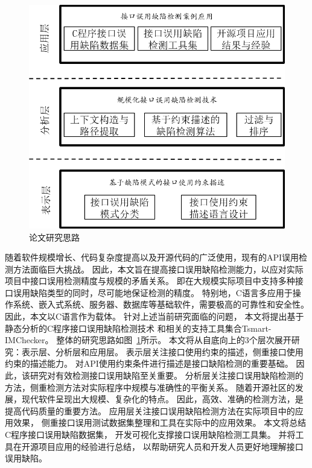 \begin{figure}[b]
	\centering
	\includegraphics[width=0.85\linewidth]{figures/cp1-overview.png}
	\caption{
		论文研究思路
	}
	\label{fig:1-3-overview}
\end{figure}

随着软件规模增长、代码复杂度提高以及开源代码的广泛使用，现有的API误用检测方法面临巨大挑战。
因此，本文旨在提高接口误用缺陷检测能力，以应对实际项目中接口误用检测精度与规模的矛盾关系。
即在大规模实际项目中支持多种接口误用缺陷类型的同时，尽可能地保证检测的精度。
特别地，C语言多应用于操作系统、嵌入式系统、服务器、数据库等基础软件，需要极高的可靠性和安全性。
因此，本文以C语言作为载体。
针对上述当前研究面临的问题，
本文将提出基于静态分析的C程序接口误用缺陷检测技术
和相关的支持工具集合Tsmart-IMChecker。
整体的研究思路如图~\ref{fig:1-3-overview}所示。
本文将从自底向上的3个层次展开研究：表示层、分析层和应用层。
表示层关注接口使用约束的描述，侧重接口使用约束的描述能力。
对API使用约束条件进行描述是接口缺陷检测的重要基础。
因此，该研究对有效检测接口误用缺陷至关重要。
分析层关注接口误用缺陷检测的方法，侧重检测方法对实际程序中规模与准确性的平衡关系。
随着开源社区的发展，现代软件呈现出大规模、复杂化的特点。
因此，高效、准确的检测方法，是提高代码质量的重要方法。
应用层关注接口误用缺陷检测方法在实际项目中的应用效果，
侧重接口误用测试数据集整理和工具在实际中的应用效果。
本文将总结C程序接口误用缺陷数据集，
开发可视化支撑接口误用缺陷检测工具集。
并将工具在开源项目应用的经验进行总结，
以帮助研究人员和开发人员更好地理解接口误用缺陷。

